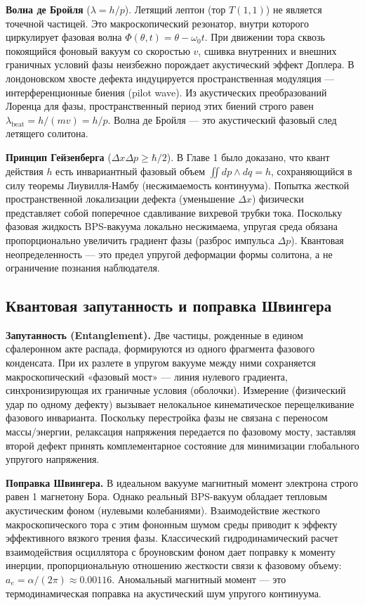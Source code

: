 \documentclass[11pt,a4paper]{article}
\begin{document}
\textbf{Волна де Бройля} ($\lambda = h/p$). Летящий лептон (тор $T(1,1)$) не является точечной частицей. Это макроскопический резонатор, внутри которого циркулирует фазовая волна $\Phi(\theta, t) = \theta - \omega_0 t$. При движении тора сквозь покоящийся фоновый вакуум со скоростью $v$, сшивка внутренних и внешних граничных условий фазы неизбежно порождает акустический эффект Доплера. В лондоновском хвосте дефекта индуцируется пространственная модуляция — интерференционные биения (pilot wave). Из акустических преобразований Лоренца для фазы, пространственный период этих биений строго равен $\lambda_{\text{beat}} = h / (mv) = h/p$. Волна де Бройля — это акустический фазовый след летящего солитона.

\textbf{Принцип Гейзенберга} ($\Delta x \Delta p \ge \hbar/2$). В Главе 1 было доказано, что квант действия $h$ есть инвариантный фазовый объем $\iint dp \wedge dq = h$, сохраняющийся в силу теоремы Лиувилля-Намбу (несжимаемость континуума). Попытка жесткой пространственной локализации дефекта (уменьшение $\Delta x$) физически представляет собой поперечное сдавливание вихревой трубки тока. Поскольку фазовая жидкость BPS-вакуума локально несжимаема, упругая среда обязана пропорционально увеличить градиент фазы (разброс импульса $\Delta p$). Квантовая неопределенность — это предел упругой деформации формы солитона, а не ограничение познания наблюдателя.

\subsection{Квантовая запутанность и поправка Швингера}
\textbf{Запутанность (Entanglement).} Две частицы, рожденные в едином сфалеронном акте распада, формируются из одного фрагмента фазового конденсата. При их разлете в упругом вакууме между ними сохраняется макроскопический «фазовый мост» — линия нулевого градиента, синхронизирующая их граничные условия (оболочки). Измерение (физический удар по одному дефекту) вызывает нелокальное кинематическое перещелкивание фазового инварианта. Поскольку перестройка фазы не связана с переносом массы/энергии, релаксация напряжения передается по фазовому мосту, заставляя второй дефект принять комплементарное состояние для минимизации глобального упругого напряжения.

\textbf{Поправка Швингера.} В идеальном вакууме магнитный момент электрона строго равен 1 магнетону Бора. Однако реальный BPS-вакуум обладает тепловым акустическим фоном (нулевыми колебаниями). Взаимодействие жесткого макроскопического тора с этим фононным шумом среды приводит к эффекту эффективного вязкого трения фазы. Классический гидродинамический расчет взаимодействия осциллятора с броуновским фоном дает поправку к моменту инерции, пропорциональную отношению жесткости связи к фазовому объему: $a_e = \alpha / (2\pi) \approx 0.00116$. Аномальный магнитный момент — это термодинамическая поправка на акустический шум упругого континуума.
	
\end{document}
